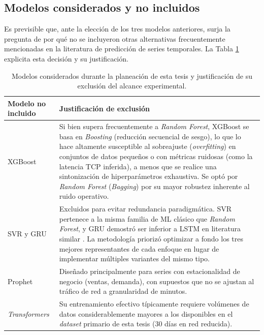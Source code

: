 \documentclass[12pt]{report}
\begin{document}
\subsection*{Modelos considerados y no incluidos}

Es previsible que, ante la elección de los tres modelos anteriores, surja la pregunta de por qué no se incluyeron otras alternativas frecuentemente mencionadas en la literatura de predicción de series temporales. La Tabla \ref{tab:modelos_excluidos} explicita esta decisión y su justificación.

\begin{table}[H]
    \centering
    \begin{tabular}{|l|p{9.5cm}|}
        \hline
        \textbf{Modelo no incluido} & \textbf{Justificación de exclusión} \\
        \hline
        XGBoost & Si bien supera frecuentemente a \textit{Random Forest}, XGBoost se basa en \textit{Boosting} (reducción secuencial de sesgo), lo que lo hace altamente susceptible al sobreajuste (\textit{overfitting}) en conjuntos de datos pequeños o con métricas ruidosas (como la latencia TCP inferida), a menos que se realice una sintonización de hiperparámetros exhaustiva. Se optó por \textit{Random Forest} (\textit{Bagging}) por su mayor robustez inherente al ruido operativo. \\
        \hline
        SVR y GRU & Excluidos para evitar redundancia paradigmática. SVR pertenece a la misma familia de ML clásico que \textit{Random Forest}, y GRU demostró ser inferior a LSTM en literatura similar \cite{santos2022}. La metodología priorizó optimizar a fondo los tres mejores representantes de cada enfoque en lugar de implementar múltiples variantes del mismo tipo. \\
        \hline
        Prophet & Diseñado principalmente para series con estacionalidad de negocio (ventas, demanda), con supuestos que no se ajustan al tráfico de red a granularidad de minutos. \\
        \hline
        \textit{Transformers} & Su entrenamiento efectivo típicamente requiere volúmenes de datos considerablemente mayores a los disponibles en el \textit{dataset} primario de esta tesis (30 días en red reducida). \\
        \hline
    \end{tabular}
    \caption{Modelos considerados durante la planeación de esta tesis y justificación de su exclusión del alcance experimental.}
    \label{tab:modelos_excluidos}
\end{table}
\end{document}
